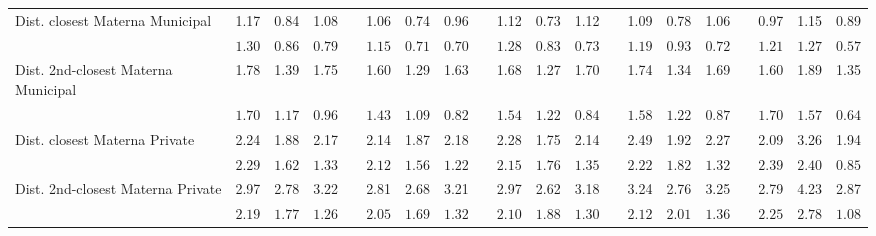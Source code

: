 \begin{center}
{\begin{longtable}{L{5cm} c c c p{.5cm} c c c p{.5cm} c c c p{.5cm} c c c p{.5cm} c c c}
Dist. closest Materna Municipal & 1.17 &      0.84 &      1.08 & &      1.06 &      0.74 &      0.96 & &      1.12 &      0.73 &      1.12 & &      1.09 &      0.78 &      1.06 & &      0.97 &      1.15 &      0.89 \\*
& $\mathit{     1.30}$ & $\mathit{     0.86}$ & $\mathit{     0.79}$ & & $\mathit{     1.15}$ & $\mathit{     0.71}$ & $\mathit{     0.70}$ & & $\mathit{     1.28}$ & $\mathit{     0.83}$ & $\mathit{     0.73}$ & & $\mathit{     1.19}$ & $\mathit{     0.93}$ & $\mathit{     0.72}$ & & $\mathit{     1.21}$ & $\mathit{     1.27}$ & $\mathit{     0.57}$ \\[.7em]
Dist. 2nd-closest Materna Municipal & 1.78 &      1.39 &      1.75 & &      1.60 &      1.29 &      1.63 & &      1.68 &      1.27 &      1.70 & &      1.74 &      1.34 &      1.69 & &      1.60 &      1.89 &      1.35 \\*
& $\mathit{     1.70}$ & $\mathit{     1.17}$ & $\mathit{     0.96}$ & & $\mathit{     1.43}$ & $\mathit{     1.09}$ & $\mathit{     0.82}$ & & $\mathit{     1.54}$ & $\mathit{     1.22}$ & $\mathit{     0.84}$ & & $\mathit{     1.58}$ & $\mathit{     1.22}$ & $\mathit{     0.87}$ & & $\mathit{     1.70}$ & $\mathit{     1.57}$ & $\mathit{     0.64}$ \\[.7em]
Dist. closest Materna Private & 2.24 &      1.88 &      2.17 & &      2.14 &      1.87 &      2.18 & &      2.28 &      1.75 &      2.14 & &      2.49 &      1.92 &      2.27 & &      2.09 &      3.26 &      1.94 \\*
& $\mathit{     2.29}$ & $\mathit{     1.62}$ & $\mathit{     1.33}$ & & $\mathit{     2.12}$ & $\mathit{     1.56}$ & $\mathit{     1.22}$ & & $\mathit{     2.15}$ & $\mathit{     1.76}$ & $\mathit{     1.35}$ & & $\mathit{     2.22}$ & $\mathit{     1.82}$ & $\mathit{     1.32}$ & & $\mathit{     2.39}$ & $\mathit{     2.40}$ & $\mathit{     0.85}$ \\[.7em]
Dist. 2nd-closest Materna Private & 2.97 &      2.78 &      3.22 & &      2.81 &      2.68 &      3.21 & &      2.97 &      2.62 &      3.18 & &      3.24 &      2.76 &      3.25 & &      2.79 &      4.23 &      2.87 \\*
& $\mathit{     2.19}$ & $\mathit{     1.77}$ & $\mathit{     1.26}$ & & $\mathit{     2.05}$ & $\mathit{     1.69}$ & $\mathit{     1.32}$ & & $\mathit{     2.10}$ & $\mathit{     1.88}$ & $\mathit{     1.30}$ & & $\mathit{     2.12}$ & $\mathit{     2.01}$ & $\mathit{     1.36}$ & & $\mathit{     2.25}$ & $\mathit{     2.78}$ & $\mathit{     1.08}$ \\[.7em]

\end{longtable}}
\end{center}
